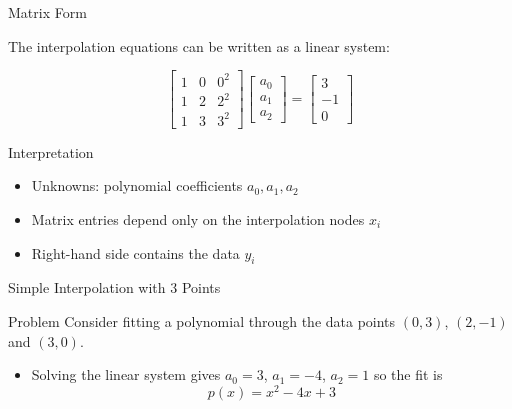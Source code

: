 \documentclass[10pt]{beamer}
\begin{document}
\begin{frame}{Matrix Form}

The interpolation equations can be written as a linear system:

\[
\begin{bmatrix}
1 & 0 & 0^2 \\
1 & 2 & 2^2 \\
1 & 3 & 3^2
\end{bmatrix}
\begin{bmatrix}
a_0 \\
a_1 \\
a_2
\end{bmatrix}
=
\begin{bmatrix}
3 \\
-1 \\
0
\end{bmatrix}
\]

\begin{block}{Interpretation}
\begin{itemize}
\item Unknowns: polynomial coefficients \(a_0,a_1,a_2\)
\item Matrix entries depend only on the interpolation nodes \(x_i\)
\item Right-hand side contains the data \(y_i\)
\end{itemize}
\end{block}

\end{frame}
\begin{frame}{Simple Interpolation with 3 Points}


\begin{block}{Problem}
    Consider fitting a polynomial through the data points $(0,3)$, $(2,-1)$ and $(3,0)$.
\end{block}


\begin{figure}
    \centering
\end{figure}
\begin{itemize}
    \item Solving the linear system gives $a_0=3$, $a_1=-4$, $a_2=1$ so the fit is 
    $$
    p(x)=  x^2 -4x  +3
    $$
\end{itemize}
    
\end{frame}
\end{document}
